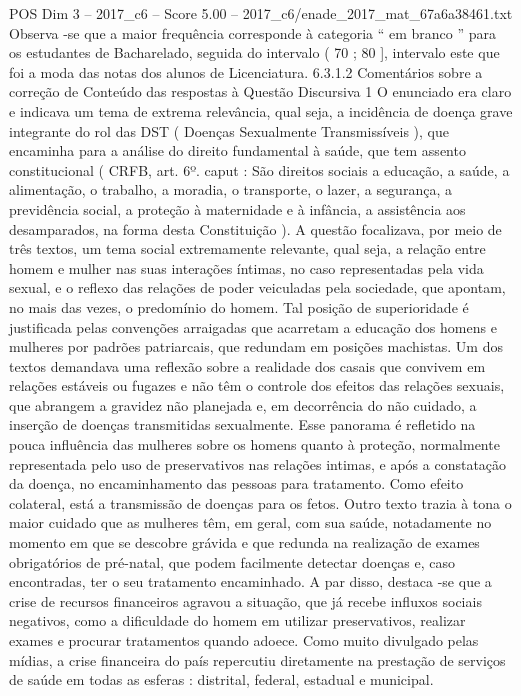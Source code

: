 \begin{textsample}{POS Dim 3 – 2017\_c6 – Score 5.00 – 2017\_c6/enade\_2017\_mat\_67a6a38461.txt}
Observa -se que a maior frequência corresponde à categoria “ em branco ” para os estudantes de Bacharelado, seguida do intervalo ( 70 ; 80 ], intervalo este que foi a moda das notas dos alunos de Licenciatura. 6.3.1.2 Comentários sobre a correção de Conteúdo das respostas à Questão Discursiva 1 O enunciado era claro e indicava um tema de extrema relevância, qual seja, a incidência de doença grave integrante do rol das DST ( Doenças Sexualmente Transmissíveis ), que encaminha para a análise do direito fundamental à saúde, que tem assento constitucional ( CRFB, art. 6º. caput : São direitos sociais a educação, a saúde, a alimentação, o trabalho, a moradia, o transporte, o lazer, a segurança, a previdência social, a proteção à maternidade e à infância, a assistência aos desamparados, na forma desta Constituição ).
A questão focalizava, por meio de três textos, um tema social extremamente relevante, qual seja, a relação entre homem e mulher nas suas interações íntimas, no caso representadas pela vida sexual, e o reflexo das relações de poder veiculadas pela sociedade, que apontam, no mais das vezes, o predomínio do homem.
Tal posição de superioridade é justificada pelas convenções arraigadas que acarretam a educação dos homens e mulheres por padrões patriarcais, que redundam em posições machistas.
Um dos textos demandava uma reflexão sobre a realidade dos casais que convivem em relações estáveis ou fugazes e não têm o controle dos efeitos das relações sexuais, que abrangem a gravidez não planejada e, em decorrência do não cuidado, a inserção de doenças transmitidas sexualmente.
Esse panorama é refletido na pouca influência das mulheres sobre os homens quanto à proteção, normalmente representada pelo uso de preservativos nas relações intimas, e após a constatação da doença, no encaminhamento das pessoas para tratamento.
Como efeito colateral, está a transmissão de doenças para os fetos.
Outro texto trazia à tona o maior cuidado que as mulheres têm, em geral, com sua saúde, notadamente no momento em que se descobre grávida e que redunda na realização de exames obrigatórios de pré-natal, que podem facilmente detectar doenças e, caso encontradas, ter o seu tratamento encaminhado.
A par disso, destaca -se que a crise de recursos financeiros agravou a situação, que já recebe influxos sociais negativos, como a dificuldade do homem em utilizar preservativos, realizar exames e procurar tratamentos quando adoece.
Como muito divulgado pelas mídias, a crise financeira do país repercutiu diretamente na prestação de serviços de saúde em todas as esferas : distrital, federal, estadual e municipal.

\end{textsample}
